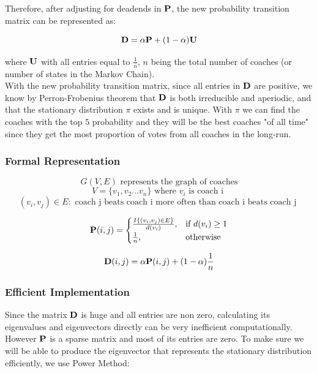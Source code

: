 \documentclass[titlepage]{article}
\begin{document}
\noindent Therefore, after adjusting for deadends in ${\bf P}$, the new probability transition matrix can be represented as:

$${\bf D} = \alpha {\bf P} + (1 - \alpha) {\bf U}$$

\noindent where $\bf{U}$ with all entries equal to $\frac{1}{n}$, $n$ being the total number of coaches (or number of states in the Markov Chain).
\\

\noindent With the new probability transition matrix, since all entries in $\bf{D}$ are positive, we know by Perron-Frobenius theorem that $\bf{D}$ is both irreducible and aperiodic, and that the stationary distribution $\pi$ exists and is unique. With $\pi$ we can find the coaches with the top $5$ probability and they will be the best coaches "of all time" since they get the most proportion of votes from all coaches in the long-run.

\subsubsection*{Formal Representation}

$$G(V, E) \mbox{ represents the graph of coaches}$$
$$V = \{v_1, v_2 ... v_n\} \mbox{ where } v_i \mbox{ is coach i }$$
$$(v_i, v_j) \in E : \mbox{ coach j beats coach i more often than coach i beats coach j }$$



\[
    {\bf P} (i, j)= 
\begin{cases}
    \frac{ I\{(v_i, v_j) \in E\}}{d(v_i)},& \text{if } d(v_i) \geq 1\\
    \frac{1}{n},              & \text{otherwise}
\end{cases}
\]

$${\bf D} (i, j) = \alpha {\bf P} (i, j)  + (1-\alpha)\frac{1}{n}$$


\subsubsection*{Efficient Implementation}

Since the matrix ${\bf D}$ is huge and all entries are non zero, calculating its eigenvalues and eigenvectors directly can be very inefficient computationally. However ${\bf P}$ is a sparse matrix and most of its entries are zero. To make sure we will be able to produce the eigenvector that represents the stationary distribution efficiently, we use Power Method:

\vspace{5mm}
\end{document}
